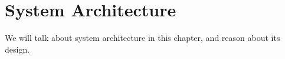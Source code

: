 
\section{System Architecture}
\label{sec:system-architecture}

We will talk about system architecture in this chapter, and reason about its design.

